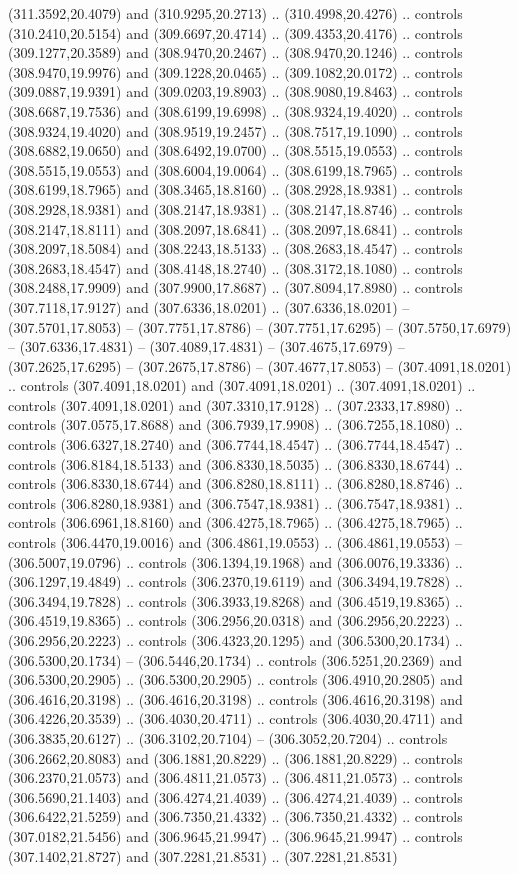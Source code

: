 (311.3592,20.4079) and (310.9295,20.2713) .. (310.4998,20.4276) .. controls (310.2410,20.5154) and (309.6697,20.4714) .. (309.4353,20.4176) .. controls (309.1277,20.3589) and (308.9470,20.2467) .. (308.9470,20.1246) .. controls (308.9470,19.9976) and (309.1228,20.0465) .. (309.1082,20.0172) .. controls (309.0887,19.9391) and (309.0203,19.8903) .. (308.9080,19.8463) .. controls (308.6687,19.7536) and (308.6199,19.6998) .. (308.9324,19.4020) .. controls (308.9324,19.4020) and (308.9519,19.2457) .. (308.7517,19.1090) .. controls (308.6882,19.0650) and (308.6492,19.0700) .. (308.5515,19.0553) .. controls (308.5515,19.0553) and (308.6004,19.0064) .. (308.6199,18.7965) .. controls (308.6199,18.7965) and (308.3465,18.8160) .. (308.2928,18.9381) .. controls (308.2928,18.9381) and (308.2147,18.9381) .. (308.2147,18.8746) .. controls (308.2147,18.8111) and (308.2097,18.6841) .. (308.2097,18.6841) .. controls (308.2097,18.5084) and (308.2243,18.5133) .. (308.2683,18.4547) .. controls (308.2683,18.4547) and (308.4148,18.2740) .. (308.3172,18.1080) .. controls (308.2488,17.9909) and (307.9900,17.8687) .. (307.8094,17.8980) .. controls (307.7118,17.9127) and (307.6336,18.0201) .. (307.6336,18.0201) -- (307.5701,17.8053) -- (307.7751,17.8786) -- (307.7751,17.6295) -- (307.5750,17.6979) -- (307.6336,17.4831) -- (307.4089,17.4831) -- (307.4675,17.6979) -- (307.2625,17.6295) -- (307.2675,17.8786) -- (307.4677,17.8053) -- (307.4091,18.0201) .. controls (307.4091,18.0201) and (307.4091,18.0201) .. (307.4091,18.0201) .. controls (307.4091,18.0201) and (307.3310,17.9128) .. (307.2333,17.8980) .. controls (307.0575,17.8688) and (306.7939,17.9908) .. (306.7255,18.1080) .. controls (306.6327,18.2740) and (306.7744,18.4547) .. (306.7744,18.4547) .. controls (306.8184,18.5133) and (306.8330,18.5035) .. (306.8330,18.6744) .. controls (306.8330,18.6744) and (306.8280,18.8111) .. (306.8280,18.8746) .. controls (306.8280,18.9381) and (306.7547,18.9381) .. (306.7547,18.9381) .. controls (306.6961,18.8160) and (306.4275,18.7965) .. (306.4275,18.7965) .. controls (306.4470,19.0016) and (306.4861,19.0553) .. (306.4861,19.0553) -- (306.5007,19.0796) .. controls (306.1394,19.1968) and (306.0076,19.3336) .. (306.1297,19.4849) .. controls (306.2370,19.6119) and (306.3494,19.7828) .. (306.3494,19.7828) .. controls (306.3933,19.8268) and (306.4519,19.8365) .. (306.4519,19.8365) .. controls (306.2956,20.0318) and (306.2956,20.2223) .. (306.2956,20.2223) .. controls (306.4323,20.1295) and (306.5300,20.1734) .. (306.5300,20.1734) -- (306.5446,20.1734) .. controls (306.5251,20.2369) and (306.5300,20.2905) .. (306.5300,20.2905) .. controls (306.4910,20.2805) and (306.4616,20.3198) .. (306.4616,20.3198) .. controls (306.4616,20.3198) and (306.4226,20.3539) .. (306.4030,20.4711) .. controls (306.4030,20.4711) and (306.3835,20.6127) .. (306.3102,20.7104) -- (306.3052,20.7204) .. controls (306.2662,20.8083) and (306.1881,20.8229) .. (306.1881,20.8229) .. controls (306.2370,21.0573) and (306.4811,21.0573) .. (306.4811,21.0573) .. controls (306.5690,21.1403) and (306.4274,21.4039) .. (306.4274,21.4039) .. controls (306.6422,21.5259) and (306.7350,21.4332) .. (306.7350,21.4332) .. controls (307.0182,21.5456) and (306.9645,21.9947) .. (306.9645,21.9947) .. controls (307.1402,21.8727) and (307.2281,21.8531) .. (307.2281,21.8531) 